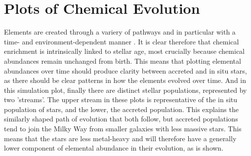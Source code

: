 \documentclass[fleqn,usenatbib]{mnras}
\begin{document}


\section{Plots of Chemical Evolution}
\label{sec:evolution}

Elements are created through a variery of pathways and in particular with a time- and environment-dependent manner \citep{Kobayashi2020}. It is clear therefore that chemical enrichment is intrinsically linked to stellar age, most crucially because chemical abundances remain unchanged from birth. This means that plotting elemental abundances over time should produce clarity between accreted and in situ stars, as there should be clear patterns in how the elements evolved over time.  And in this simulation plot, finally there are distinct stellar populations, represented by two 'streams'. The upper stream in these plots is representative of the in situ population of stars, and the lower, the accreted population. This explains the similarly shaped path of evolution that both follow, but accreted populations tend to join the Milky Way from smaller galaxies with less massive stars. This means that the stars are less metal-heavy and will therefore have a generally lower component of elemental abundance in their evolution, as is shown.  
\end{document}
